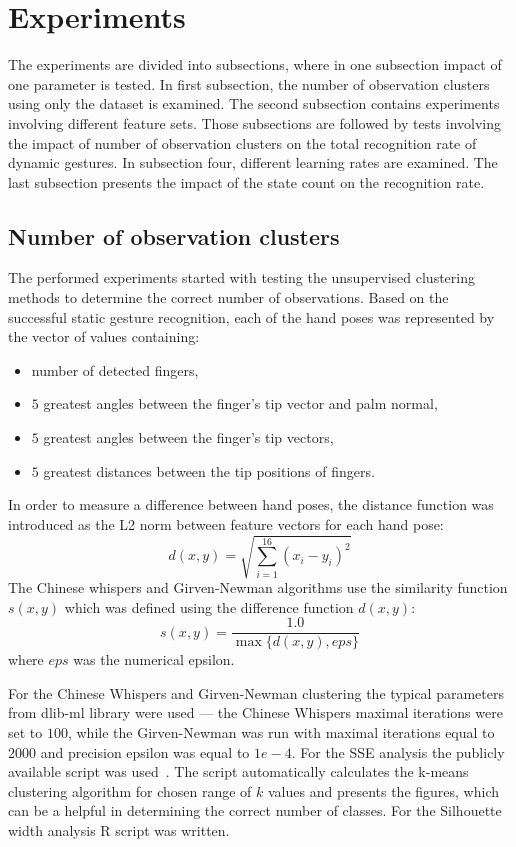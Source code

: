 \section{Experiments}
The experiments are divided into subsections, where in one subsection impact of one parameter is tested.
In first subsection, the number of observation clusters using only the dataset is examined.
The second subsection contains experiments involving different feature sets.
Those subsections are followed by tests involving the impact of number of observation clusters on the total recognition rate of dynamic gestures.
In subsection four, different learning rates are examined. The last subsection presents the impact of the state count on the recognition rate. 

\subsection{Number of observation clusters} \label{numberOfClasses1}

The performed experiments started with testing the unsupervised clustering methods to determine the correct number of observations.
Based on the successful static gesture recognition, each of the hand poses was represented by the vector of values containing:
\begin{itemize}
\item number of detected fingers,
\item $5$ greatest angles between the finger's tip vector and palm normal,
\item $5$ greatest angles between the finger's tip vectors,
\item $5$ greatest distances between the tip positions of fingers.
\end{itemize}
In order to measure a difference between hand poses, the distance function was introduced as the L2 norm between feature vectors for each hand pose:
\begin{equation}
d(x,y) = \sqrt{ \sum_{i=1}^{16} (x_i - y_i)^2 }
\end{equation}
The Chinese whispers and Girven-Newman algorithms use the similarity function $s(x,y)$ which was defined using the difference function $d(x,y)$: 
\begin{equation}
s(x,y) = \frac{1.0}{ \max{\{d(x,y), eps\}}}
\end{equation}
where $eps$ was the numerical epsilon.

For the Chinese Whispers and Girven-Newman clustering the typical parameters from dlib-ml library were used --- the Chinese Whispers maximal iterations were set to $100$, while the Girven-Newman was run with maximal iterations equal to $2000$ and precision epsilon was equal to $1e-4$.
For the SSE analysis the publicly available script was used~\cite{SSE}. 
The script automatically calculates the k-means clustering algorithm for chosen range of $k$ values and presents the figures, which can be a helpful in determining the correct number of classes.
For the Silhouette width analysis R script was written.

